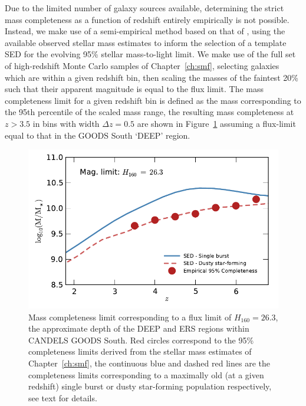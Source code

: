 Due to the limited number of galaxy sources available, determining the strict mass completeness as a function of redshift entirely empirically \citep{Pozzetti:2010gw} is not possible. Instead, we make use of a semi-empirical method based on that of \citet{Pozzetti:2010gw}, using the available observed stellar mass estimates to inform the selection of a template SED for the evolving 95\% stellar mass-to-light limit. We make use of the full set of high-redshift Monte Carlo samples of Chapter~\ref{ch:smf}, selecting galaxies which are within a given redshift bin, then scaling the masses of the faintest 20\% such that their apparent magnitude is equal to the flux limit. The mass completeness limit for a given redshift bin is defined as the mass corresponding to the 95th percentile of the scaled mass range, the resulting mass completeness at $z > 3.5$ in bins with width $\Delta z = 0.5$ are shown in Figure~\ref{merger-fig:mass_comp} assuming a flux-limit equal to that in the GOODS South `DEEP' region.

\begin{figure}
\centering
	\includegraphics[width=0.8\columnwidth]{plots/MassCompleteness.pdf}
  \caption[]{Mass completeness limit corresponding to a flux limit of $H_{160} = 26.3$, the approximate depth of the DEEP and ERS regions within CANDELS GOODS South. Red circles correspond to the 95\% completeness limits derived from the stellar mass estimates of Chapter~\ref{ch:smf}, the continuous blue and dashed red lines are the completeness limits corresponding to a maximally old (at a given redshift) single burst or dusty star-forming population respectively, see text for details.}
  \label{merger-fig:mass_comp}
\end{figure}

